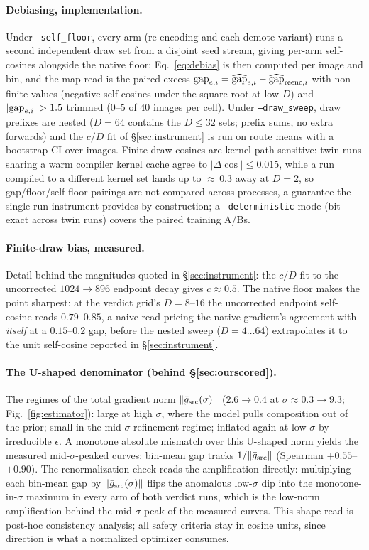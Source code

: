 \paragraph{Debiasing, implementation.} Under
\texttt{--self\_floor}, every arm (re-encoding and each demote variant)
runs a second independent draw set from a disjoint seed stream, giving
per-arm self-cosines alongside the native floor; Eq.~\ref{eq:debias} is
then computed per image and bin, and the map read is the paired
excess $\mathrm{gap}_{e,i} = \widehat{\mathrm{gap}}_{e,i} - \widehat{\mathrm{gap}}_{\mathrm{reenc},i}$ with non-finite
values (negative self-cosines under the square root at low $D$) and
$|\mathrm{gap}_{e,i}| > 1.5$ trimmed ($0$--$5$ of $40$ images per cell). Under
\texttt{--draw\_sweep}, draw prefixes are nested ($D = 64$ contains the
$D \le 32$ sets; prefix sums, no extra forwards) and the $c/D$ fit of
\S\ref{sec:instrument} is run on route means with a bootstrap CI
over images. Finite-draw cosines are kernel-path sensitive: twin runs
sharing a warm compiler kernel cache agree to $|\Delta\cos| \le 0.015$,
while a run compiled to a different kernel set lands up to
${\approx}\,0.3$ away at $D{=}2$, so gap/floor/self-floor pairings
are not compared across processes, a guarantee the single-run
instrument provides by construction; a \texttt{--deterministic} mode
(bit-exact across twin runs) covers the paired training A/Bs.

\paragraph{Finite-draw bias, measured.} Detail behind the magnitudes
quoted in \S\ref{sec:instrument}: the $c/D$ fit to the uncorrected
$1024{\to}896$ endpoint decay gives $c \approx 0.5$. The native
floor makes the point sharpest: at the verdict grid's $D{=}8$--$16$
the uncorrected endpoint self-cosine reads $0.79$--$0.85$, a naive
read pricing the native gradient's agreement with \emph{itself} at a
$0.15$--$0.2$ gap, before the nested sweep ($D = 4 \ldots 64$)
extrapolates it to the unit self-cosine reported in
\S\ref{sec:instrument}.

\paragraph{The U-shaped denominator (behind \S\ref{sec:ourscored}).}
The regimes of the total gradient norm $\|\bar g_{\mathrm{src}}(\sigma)\|$
($2.6 \to 0.4$ at $\sigma\!\approx\!0.3 \to 9.3$;
Fig.~\ref{fig:estimator}): large at high $\sigma$, where the model
pulls composition out of the prior; small in the mid-$\sigma$
refinement regime; inflated again at low $\sigma$ by irreducible
$\epsilon$. A monotone absolute mismatch over this U-shaped norm
yields the measured mid-$\sigma$-peaked curves: bin-mean gap
tracks $1/\|\bar g_{\mathrm{src}}\|$ (Spearman $+0.55$--$+0.90$). The
renormalization check reads the amplification
directly: multiplying each bin-mean gap by
$\|\bar g_{\mathrm{src}}(\sigma)\|$ flips the anomalous low-$\sigma$ dip into
the monotone-in-$\sigma$ maximum in every arm of both verdict runs,
which is the low-norm amplification behind the mid-$\sigma$ peak of the
measured curves. This shape read is post-hoc consistency analysis;
all safety criteria stay in cosine units, since direction is what a
normalized optimizer consumes.

